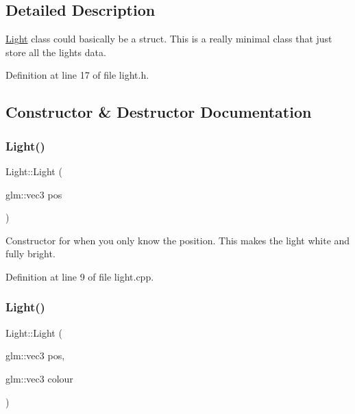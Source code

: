 \subsection{Detailed Description}
\mbox{\hyperlink{class_light}{Light}} class could basically be a struct. This is a really minimal class that just store all the light\textquotesingle{}s data. 

Definition at line 17 of file light.\+h.



\subsection{Constructor \& Destructor Documentation}
\mbox{\label{class_light_a62bbd4eb90c31a7e07a3153b7ce5d1d4}} 
\subsubsection{\texorpdfstring{Light()}{Light()}\hspace{0.1cm}{\footnotesize\ttfamily [1/2]}}
{\footnotesize\ttfamily Light\+::\+Light (\begin{DoxyParamCaption}\item[{glm\+::vec3}]{pos }\end{DoxyParamCaption})}



Constructor for when you only know the position. This makes the light white and fully bright. 



Definition at line 9 of file light.\+cpp.

\mbox{\label{class_light_ab2624427110cf6d5d905159d70c827b6}} 
\subsubsection{\texorpdfstring{Light()}{Light()}\hspace{0.1cm}{\footnotesize\ttfamily [2/2]}}
{\footnotesize\ttfamily Light\+::\+Light (\begin{DoxyParamCaption}\item[{glm\+::vec3}]{pos,  }\item[{glm\+::vec3}]{colour }\end{DoxyParamCaption})}



